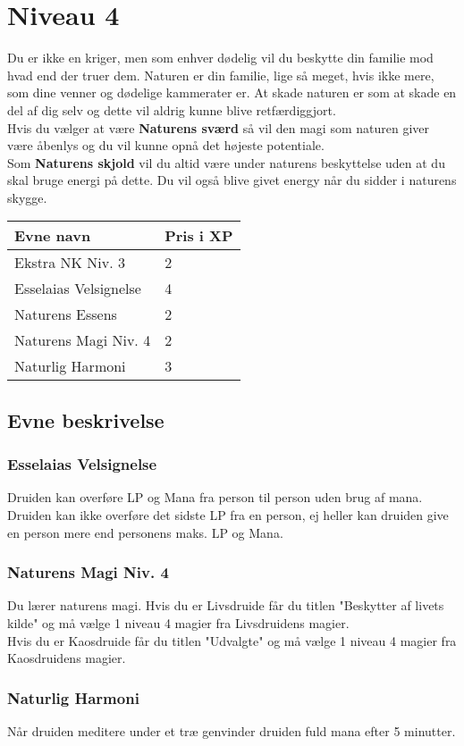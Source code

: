 \chapter{Niveau 4}
Du er ikke en kriger, men som enhver dødelig vil du beskytte din familie mod hvad end der truer dem. Naturen er din familie, lige så meget, hvis ikke mere, som dine venner og dødelige kammerater er. At skade naturen er som at skade en del af dig selv og dette vil aldrig kunne blive retfærdiggjort.\\
Hvis du vælger at være \textbf{Naturens sværd} så vil den magi som naturen giver være åbenlys og du vil kunne opnå det højeste potentiale.\\
Som \textbf{Naturens skjold} vil du altid være under naturens beskyttelse uden at du skal bruge energi på dette. Du vil også blive givet energy når du sidder i naturens skygge.\\

\begin{table}[H]
    \centering
    \begin{tabular}{|p{}|p{}|}
    \rowcolor{cerulean!80}\hline
        Evne navn & Pris i XP \\\hline
        Ekstra NK Niv. 3 & 2\\\hline
        Esselaias Velsignelse & 4\\\hline
        Naturens Essens & 2 \\\hline
        Naturens Magi Niv. 4 & 2 \\\hline
        Naturlig Harmoni &3\\\hline
    \end{tabular}
\end{table}
\section{Evne beskrivelse}



\subsection{Esselaias Velsignelse}
Druiden kan overføre LP og Mana fra person til person uden brug af mana.
Druiden kan ikke overføre det sidste LP fra en person, ej heller kan druiden give
en person mere end personens maks. LP og Mana.

\subsection{Naturens Magi Niv. 4}
Du lærer naturens magi. Hvis du er Livsdruide får du titlen "Beskytter af livets kilde" og må vælge 1 niveau 4 magier fra Livsdruidens magier.\\ Hvis du er Kaosdruide får du titlen "Udvalgte" og må vælge 1 niveau 4 magier fra Kaosdruidens magier.\\


\subsection{Naturlig Harmoni}
Når druiden meditere under et træ genvinder druiden fuld mana efter 5 minutter.